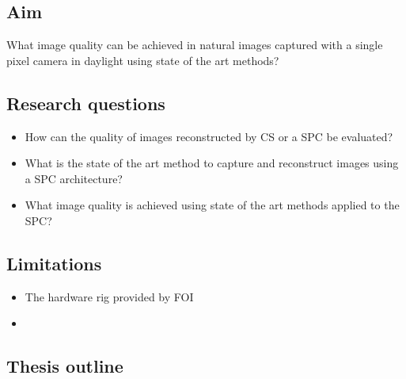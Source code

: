 \subsection{Aim} 
What image quality can be achieved in natural images captured with a single pixel camera in daylight using state of the art methods?  


\subsection{Research questions} 
\label{sec:RQ}
\begin{itemize}
    \item How can the quality of images reconstructed by CS or a SPC be evaluated?
    \item What is the state of the art method to capture and reconstruct images using a SPC architecture?
    \item What image quality is achieved using state of the art methods applied to the SPC?
\end{itemize}

\subsection{Limitations}
\begin{itemize}
    \item The hardware rig provided by FOI
    \item 
\end{itemize}



\subsection{Thesis outline}

